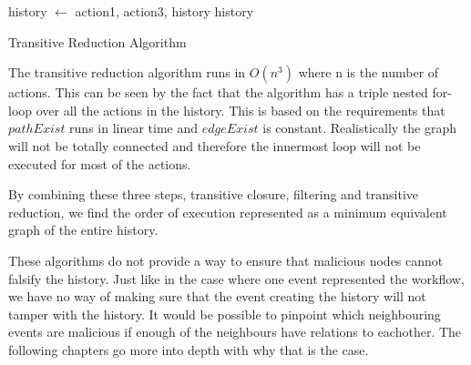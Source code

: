 	\begin{algorithm}
		\begin{algorithmic}
										\State history $\leftarrow$  {action1, action3, history}
									\EndIf
								\EndIf
							\EndFor
						\EndIf
					\EndFor
				\EndFor
			\State
			\Return history
			\EndFunction
		\end{algorithmic}
		\caption{Transitive Reduction Algorithm}
	\end{algorithm}
	
	\newpar The transitive reduction algorithm runs in $O(n^3)$ where n is the number of actions. This can be seen by the fact that the algorithm has a triple nested for-loop over all the actions in the history. This is based on the requirements that $pathExist$ runs in linear time and $edgeExist$ is constant. Realistically the graph will not be totally connected and therefore the innermost loop will not be executed for most of the actions.
	
	\newpar By combining these three steps, transitive closure, filtering and transitive reduction, we find the order of execution represented as a minimum equivalent graph of the entire history. 
	
	\newpar These algorithms do not provide a way to ensure that malicious nodes cannot falsify the history. Just like in the case where one event represented the workflow, we have no way of making sure that the event creating the history will not tamper with the history. It would be possible to pinpoint which neighbouring events are malicious if enough of the neighbours have relations to eachother. The following chapters go more into depth with why that is the case.
	